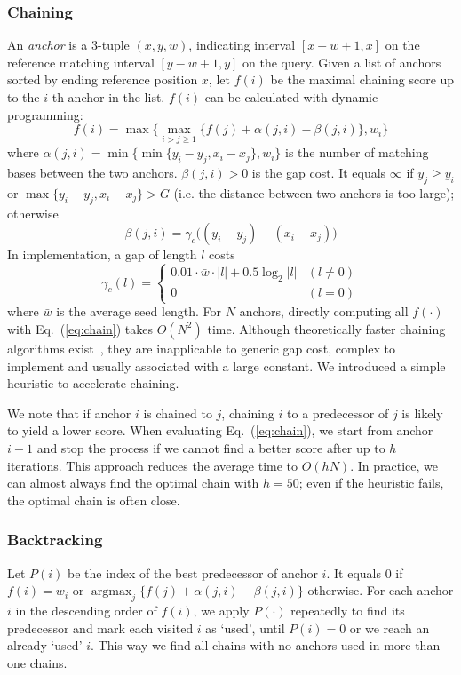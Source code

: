 \documentclass{bioinfo}
\DeclareMathOperator*{\argmax}{argmax}
\begin{document}
\begin{methods}
\subsubsection{Chaining}
An \emph{anchor} is a 3-tuple $(x,y,w)$, indicating interval $[x-w+1,x]$ on the
reference matching interval $[y-w+1,y]$ on the query. Given a list of anchors
sorted by ending reference position $x$, let $f(i)$ be the maximal chaining
score up to the $i$-th anchor in the list. $f(i)$ can be calculated with
dynamic programming:
\begin{equation}\label{eq:chain}
f(i)=\max\big\{\max_{i>j\ge 1} \{ f(j)+\alpha(j,i)-\beta(j,i) \},w_i\big\}
\end{equation}
where $\alpha(j,i)=\min\big\{\min\{y_i-y_j,x_i-x_j\},w_i\big\}$ is the number of
matching bases between the two anchors. $\beta(j,i)>0$ is the gap cost. It
equals $\infty$ if $y_j\ge y_i$ or $\max\{y_i-y_j,x_i-x_j\}>G$ (i.e. the
distance between two anchors is too large); otherwise
\begin{equation}\label{eq:chain-gap}
\beta(j,i)=\gamma_c\big((y_i-y_j)-(x_i-x_j)\big)
\end{equation}
In implementation, a gap of length $l$ costs
\[
\gamma_c(l)=\left\{\begin{array}{ll}
0.01\cdot \bar{w}\cdot|l|+0.5\log_2|l| & (l\not=0) \\
0 & (l=0)
\end{array}\right.
\]
where $\bar{w}$ is the average seed length. For $N$ anchors, directly computing all $f(\cdot)$ with
Eq.~(\ref{eq:chain}) takes $O(N^2)$ time. Although theoretically faster
chaining algorithms exist~\citep{Abouelhoda:2005aa}, they
are inapplicable to generic gap cost, complex to implement and usually
associated with a large constant. We introduced a simple heuristic to
accelerate chaining.

We note that if anchor $i$ is chained to $j$, chaining $i$ to a predecessor
of $j$ is likely to yield a lower score. When evaluating Eq.~(\ref{eq:chain}),
we start from anchor $i-1$ and stop the process if we cannot find a better
score after up to $h$ iterations. This approach reduces the average time to
$O(hN)$. In practice, we can almost always find the optimal chain with
$h=50$; even if the heuristic fails, the optimal chain is often close.

\subsubsection{Backtracking}
Let $P(i)$ be the index of the best predecessor of anchor $i$. It equals 0 if
$f(i)=w_i$ or $\argmax_j\{f(j)+\alpha(j,i)-\beta(j,i)\}$ otherwise. For each
anchor $i$ in the descending order of $f(i)$, we apply $P(\cdot)$ repeatedly to
find its predecessor and mark each visited $i$ as `used', until $P(i)=0$ or we
reach an already `used' $i$. This way we find all chains with no anchors used
in more than one chains.


\end{methods}
\end{document}
